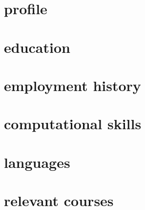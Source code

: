 \documentclass{prometheus_cv}
\begin{document}
\thispagestyle{empty}
\pagestyle{fancy}

\vspace*{-1cm}
\centering


\vspace*{0.4cm}

\section{profile}


\section{education}


\section{employment history}


\section{computational skills}


\section{languages}


\section{relevant courses}

\end{document}
